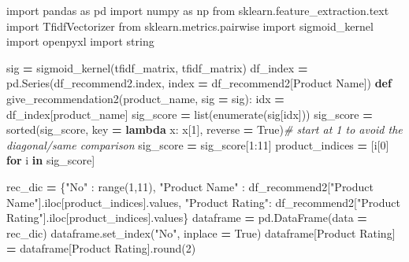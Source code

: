 \documentclass[
]{article}
\newenvironment{Shaded}{\begin{snugshade}}{\end{snugshade}}
\newcommand{\BuiltInTok}[1]{#1}
\newcommand{\CommentTok}[1]{\textcolor[rgb]{0.56,0.35,0.01}{\textit{#1}}}
\newcommand{\ControlFlowTok}[1]{\textcolor[rgb]{0.13,0.29,0.53}{\textbf{#1}}}
\newcommand{\DecValTok}[1]{\textcolor[rgb]{0.00,0.00,0.81}{#1}}
\newcommand{\ImportTok}[1]{#1}
\newcommand{\KeywordTok}[1]{\textcolor[rgb]{0.13,0.29,0.53}{\textbf{#1}}}
\newcommand{\NormalTok}[1]{#1}
\newcommand{\OperatorTok}[1]{\textcolor[rgb]{0.81,0.36,0.00}{\textbf{#1}}}
\newcommand{\StringTok}[1]{\textcolor[rgb]{0.31,0.60,0.02}{#1}}
\newcommand{\VariableTok}[1]{\textcolor[rgb]{0.00,0.00,0.00}{#1}}
\begin{document}
\begin{Shaded}
\begin{Highlighting}[]
\ImportTok{import}\NormalTok{ pandas }\ImportTok{as}\NormalTok{ pd}
\ImportTok{import}\NormalTok{ numpy }\ImportTok{as}\NormalTok{ np}
\ImportTok{from}\NormalTok{ sklearn.feature\_extraction.text }\ImportTok{import}\NormalTok{ TfidfVectorizer}
\ImportTok{from}\NormalTok{ sklearn.metrics.pairwise }\ImportTok{import}\NormalTok{ sigmoid\_kernel}
\ImportTok{import}\NormalTok{ openpyxl}
\ImportTok{import}\NormalTok{ string}

\NormalTok{sig }\OperatorTok{=}\NormalTok{ sigmoid\_kernel(tfidf\_matrix, tfidf\_matrix)}
\NormalTok{df\_index }\OperatorTok{=}\NormalTok{ pd.Series(df\_recommend2.index, index }\OperatorTok{=}\NormalTok{ df\_recommend2[}\StringTok{\textquotesingle{}Product Name\textquotesingle{}}\NormalTok{])}
\KeywordTok{def}\NormalTok{ give\_recommendation2(product\_name, sig }\OperatorTok{=}\NormalTok{ sig):}
\NormalTok{    idx }\OperatorTok{=}\NormalTok{ df\_index[product\_name]}
\NormalTok{    sig\_score }\OperatorTok{=} \BuiltInTok{list}\NormalTok{(}\BuiltInTok{enumerate}\NormalTok{(sig[idx]))}
\NormalTok{    sig\_score }\OperatorTok{=} \BuiltInTok{sorted}\NormalTok{(sig\_score, key }\OperatorTok{=} \KeywordTok{lambda}\NormalTok{ x: x[}\DecValTok{1}\NormalTok{], reverse }\OperatorTok{=} \VariableTok{True}\NormalTok{)}\CommentTok{\# start at 1 to avoid the diagonal/same comparison}
\NormalTok{    sig\_score }\OperatorTok{=}\NormalTok{ sig\_score[}\DecValTok{1}\NormalTok{:}\DecValTok{11}\NormalTok{]}
\NormalTok{    product\_indices }\OperatorTok{=}\NormalTok{ [i[}\DecValTok{0}\NormalTok{] }\ControlFlowTok{for}\NormalTok{ i }\KeywordTok{in}\NormalTok{ sig\_score]}
    
\NormalTok{    rec\_dic }\OperatorTok{=}\NormalTok{ \{}\StringTok{"No"}\NormalTok{ : }\BuiltInTok{range}\NormalTok{(}\DecValTok{1}\NormalTok{,}\DecValTok{11}\NormalTok{), }
               \StringTok{"Product Name"}\NormalTok{ : df\_recommend2[}\StringTok{"Product Name"}\NormalTok{].iloc[product\_indices].values, }
               \StringTok{"Product Rating"}\NormalTok{: df\_recommend2[}\StringTok{"Product Rating"}\NormalTok{].iloc[product\_indices].values\}}
\NormalTok{    dataframe }\OperatorTok{=}\NormalTok{ pd.DataFrame(data }\OperatorTok{=}\NormalTok{ rec\_dic)}
\NormalTok{    dataframe.set\_index(}\StringTok{"No"}\NormalTok{, inplace }\OperatorTok{=} \VariableTok{True}\NormalTok{)}
\NormalTok{    dataframe[}\StringTok{\textquotesingle{}Product Rating\textquotesingle{}}\NormalTok{] }\OperatorTok{=}\NormalTok{ dataframe[}\StringTok{\textquotesingle{}Product Rating\textquotesingle{}}\NormalTok{].}\BuiltInTok{round}\NormalTok{(}\DecValTok{2}\NormalTok{)}
    

\end{Highlighting}
\end{Shaded}
\end{document}
